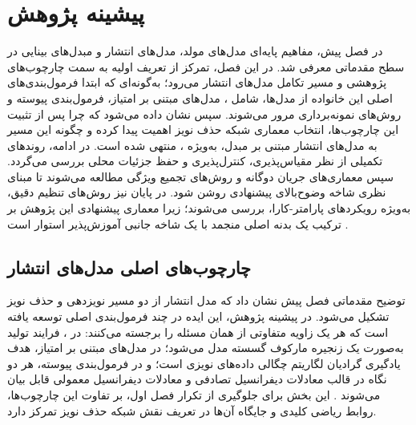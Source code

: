 \chapter{پیشینه پژوهش}\label{chp2}

در فصل پیش، مفاهیم پایه‌ای مدل‌های مولد، مدل‌های انتشار و مبدل‌های بینایی در سطح مقدماتی معرفی شد. در این فصل، تمرکز از تعریف اولیه به سمت چارچوب‌های پژوهشی و مسیر تکامل مدل‌های انتشار می‌رود؛ به‌گونه‌ای که ابتدا فرمول‌بندی‌های اصلی این خانواده از مدل‌ها، شامل ، مدل‌های مبتنی بر امتیاز، فرمول‌بندی پیوسته و روش‌های نمونه‌برداری مرور می‌شوند. سپس نشان داده می‌شود که چرا پس از تثبیت این چارچوب‌ها، انتخاب معماری شبکه حذف نویز اهمیت پیدا کرده و چگونه این مسیر به مدل‌های انتشار مبتنی بر مبدل، به‌ویژه ، منتهی شده است. در ادامه، روندهای تکمیلی از نظر مقیاس‌پذیری، کنترل‌پذیری و حفظ جزئیات محلی بررسی می‌گردد. سپس معماری‌های جریان دوگانه و روش‌های تجمیع ویژگی مطالعه می‌شوند تا مبنای نظری شاخه وضوح‌بالای پیشنهادی روشن شود. در پایان نیز روش‌های تنظیم دقیق، به‌ویژه رویکردهای پارامتر-کارا، بررسی می‌شوند؛ زیرا معماری پیشنهادی این پژوهش بر ترکیب یک بدنه اصلی منجمد با یک شاخه جانبی آموزش‌پذیر استوار است \cite{0214306,2212.09748,chen2021crossvit,8409325}.

\section{چارچوب‌های اصلی مدل‌های انتشار}
\label{sec:ch2-diffusion-frameworks}
توضیح مقدماتی فصل پیش نشان داد که مدل انتشار از دو مسیر نویزدهی و حذف نویز تشکیل می‌شود. در پیشینه پژوهش، این ایده در چند فرمول‌بندی اصلی توسعه یافته است که هر یک زاویه متفاوتی از همان مسئله را برجسته می‌کنند: در ، فرایند تولید به‌صورت یک زنجیره مارکوف گسسته مدل می‌شود؛ در مدل‌های مبتنی بر امتیاز، هدف یادگیری گرادیان لگاریتم چگالی داده‌های نویزی است؛ و در فرمول‌بندی پیوسته، هر دو نگاه در قالب معادلات دیفرانسیل تصادفی و معادلات دیفرانسیل معمولی قابل بیان می‌شوند \cite{sohlDickstein2015deepUnsupervised,ho2020ddpm,song2019scoreGenerative,song2021scoreSDE}. این بخش برای جلوگیری از تکرار فصل اول، بر تفاوت این چارچوب‌ها، روابط ریاضی کلیدی و جایگاه آن‌ها در تعریف نقش شبکه حذف نویز تمرکز دارد.

